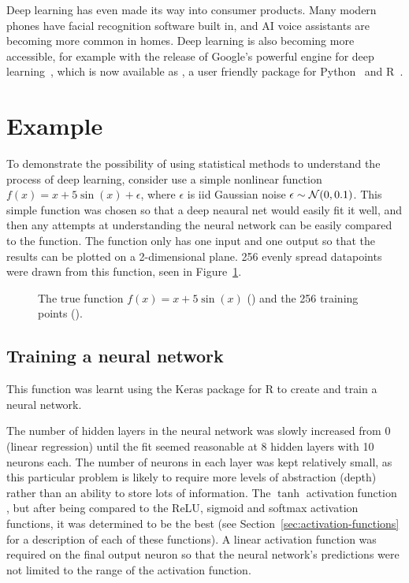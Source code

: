 Deep learning has even made its way into consumer products.
Many modern phones have facial recognition software built in, and \ac{AI} voice assistants are becoming more common in homes.
Deep learning is also becoming more accessible, for example with the release of Google's powerful  engine for deep learning~\autocite{abadi2016}, which is now available as , a user friendly package for Python~\autocite{chollet2015} and R~\autocite{allaire2018}.

\section{Example}

To demonstrate the possibility of using statistical methods to understand the process of deep learning, consider use a simple nonlinear function \(f(x) = x + 5 \sin(x) + \epsilon\), where \(\epsilon\) is iid Gaussian noise \(\epsilon \sim \mathcal{N}(0, 0.1)\).
This simple function was chosen so that a deep neaural net would easily fit it well, and then any attempts at understanding the neural network can be easily compared to the  function.
The function only has one input and one output so that the results can be plotted on a 2-dimensional plane.
256 evenly spread datapoints were drawn from this function, seen in Figure~\ref{fig:sin-x-dataset}.

\begin{figure}[htbp]
	\centering
	
	\caption{The true function \(f(x) = x + 5 \sin(x)\) (\truthcolour) and the 256 training points (\traincolour).}
	\label{fig:sin-x-dataset}
\end{figure}

\subsection{Training a neural network}

This function was learnt using the Keras package for R \autocite{allaire2018} to create and train a neural network.

The number of hidden layers in the neural network was slowly increased from 0 (linear regression) until the fit seemed reasonable at 8 hidden layers with 10 neurons each.
The number of neurons in each layer was kept relatively small, as this particular problem is likely to require more levels of abstraction (depth) rather than an ability to store lots of information.
The \(\tanh\) activation function , but after being compared to the \ac{ReLU}, sigmoid and softmax activation functions, it was determined to be the best (see Section~\ref{sec:activation-functions} for a description of each of these functions).
A linear activation function was required on the final output neuron so that the neural network's predictions were not limited to the range of the activation function.

